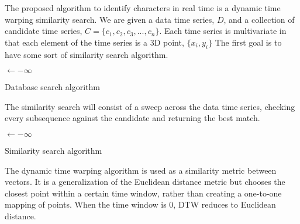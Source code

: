The proposed algorithm to identify characters in real time is a dynamic time warping similarity search. 
We are given a data time series, \(D\), and a collection of candidate time series, \( C = \{c_1, c_2, c_3, ..., c_n\}\).
Each time series is multivariate in that each element of the time series is a 3D point, \(\{x_i, y_i\}\)
The first goal is to have some sort of similarity search algorithm.
\begin{algorithm}[h]



 \Input{\Collection, \D}
 \Best$\leftarrow -\infty$\;
 \Return{\Distance, \Location}
 \caption{Database search algorithm}
\end{algorithm}

The similarity search will consist of a sweep across the data time series, checking every subsequence against the candidate and returning the best match.
\begin{algorithm}[h]




 \Best$\leftarrow -\infty$\;
 \caption{Similarity search algorithm}
\end{algorithm}

The dynamic time warping algorithm is used as a similarity metric between vectors. It is a generalization of the Euclidean distance metric but chooses the closest point within a certain time window, rather than creating a one-to-one mapping of points. When the time window is 0, DTW reduces to Euclidean distance.

